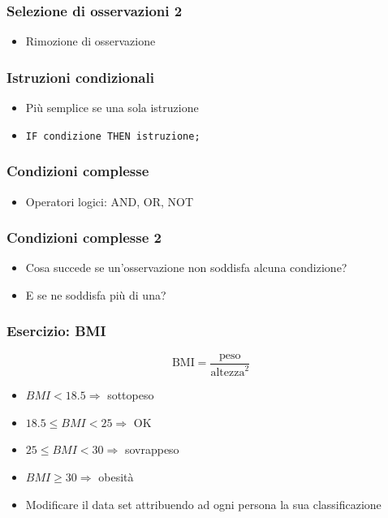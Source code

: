 \begin{frame}[containsverbatim]\frametitle{Selezione di osservazioni 2}
  \begin{itemize}
  \item
    Rimozione di osservazione
  \end{itemize}\end{frame}

\begin{frame}[containsverbatim]\frametitle{Istruzioni condizionali}
  \begin{itemize}
  \item
    Pi{\`u} semplice se una sola istruzione
  \item
    \verb!IF condizione THEN istruzione;!
  \end{itemize}
\end{frame}

\begin{frame}[containsverbatim]\frametitle{Condizioni complesse}
  \begin{itemize}
  \item
    Operatori logici: AND, OR, NOT
  \end{itemize}
\end{frame}

\begin{frame}[containsverbatim]\frametitle{Condizioni complesse 2}
  \begin{itemize}
  \item
    Cosa succede se un'osservazione non soddisfa alcuna condizione?
  \item
    E se ne soddisfa pi{\`u} di una?
  \end{itemize}
\end{frame}



\begin{frame}\frametitle{Esercizio: BMI}
  $$\text{BMI} = \frac{\text{peso}}{\text{altezza}^2}$$
  \begin{itemize}
  \item
    $BMI < 18.5 \Rightarrow$ sottopeso
  \item
    $18.5 \le BMI < 25 \Rightarrow$ OK
  \item
    $25 \le BMI < 30 \Rightarrow$ sovrappeso
  \item
    $BMI \ge 30 \Rightarrow$ obesit{\`a}
  \item
    Modificare il data set attribuendo ad ogni persona la sua classificazione
  \end{itemize}\end{frame}






